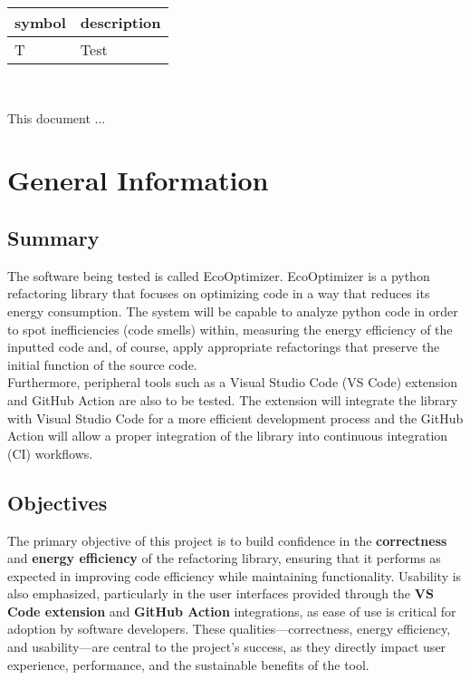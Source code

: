 \documentclass[12pt, titlepage]{article}
\begin{document}
\renewcommand{\arraystretch}{1.2}
\begin{tabular}{l l} 
  \toprule		
  \textbf{symbol} & \textbf{description}\\
  \midrule 
  T & Test\\
  \bottomrule
\end{tabular}\\



\newpage


This document ... 

\section{General Information}

\subsection{Summary}

The software being tested is called EcoOptimizer. EcoOptimizer is a python refactoring library that focuses on optimizing code in a way that reduces its energy consumption. The system will be capable to analyze python code in order to spot inefficiencies (code smells) within, measuring the energy efficiency of the inputted code and, of course, apply appropriate refactorings that preserve the initial function of the source code. \\

Furthermore, peripheral tools such as a Visual Studio Code (VS Code) extension and GitHub Action are also to be tested. The extension will integrate the library with Visual Studio Code for a more efficient development process and the GitHub Action will allow a proper integration of the library into continuous integration (CI) workflows.

\subsection{Objectives}

The primary objective of this project is to build confidence in the \textbf{correctness} and \textbf{energy efficiency} of the refactoring library, ensuring that it performs as expected in improving code efficiency while maintaining functionality. Usability is also emphasized, particularly in the user interfaces provided through the \textbf{VS Code extension} and \textbf{GitHub Action} integrations, as ease of use is critical for adoption by software developers. These qualities—correctness, energy efficiency, and usability—are central to the project’s success, as they directly impact user experience, performance, and the sustainable benefits of the tool.\\
\end{document}
